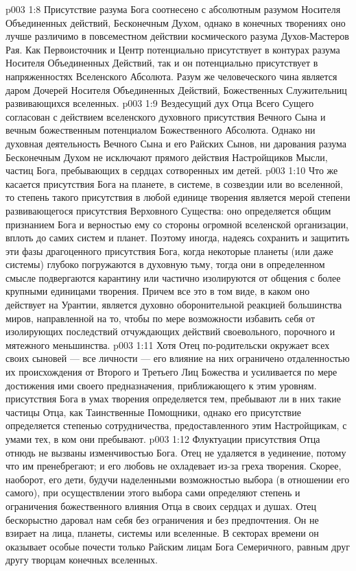 \vs p003 1:8 Присутствие разума Бога соотнесено с абсолютным разумом Носителя Объединенных действий, Бесконечным Духом, однако в конечных творениях оно лучше различимо в повсеместном действии космического разума Духов\hyp{}Мастеров Рая. Как Первоисточник и Центр потенциально присутствует в контурах разума Носителя Объединенных Действий, так и он потенциально присутствует в напряженностях Вселенского Абсолюта. Разум же человеческого чина является даром Дочерей Носителя Объединенных Действий, Божественных Служительниц развивающихся вселенных.
\vs p003 1:9 Вездесущий дух Отца Всего Сущего согласован с действием вселенского духовного присутствия Вечного Сына и вечным божественным потенциалом Божественного Абсолюта. Однако ни духовная деятельность Вечного Сына и его Райских Сынов, ни дарования разума Бесконечным Духом не исключают прямого действия Настройщиков Мысли, частиц Бога, пребывающих в сердцах сотворенных им детей.
\vs p003 1:10 Что же касается присутствия Бога на планете, в системе, в созвездии или во вселенной, то степень такого присутствия в любой единице творения является мерой степени развивающегося присутствия Верховного Существа: оно определяется общим признанием Бога и верностью ему со стороны огромной вселенской организации, вплоть до самих систем и планет. Поэтому иногда, надеясь сохранить и защитить эти фазы драгоценного присутствия Бога, когда некоторые планеты (или даже системы) глубоко погружаются в духовную тьму, тогда они в определенном смысле подвергаются карантину или частично изолируются от общения с более крупными единицами творения. Причем все это в том виде, в каком оно действует на Урантии, является духовно оборонительной реакцией большинства миров, направленной на то, чтобы по мере возможности избавить себя от изолирующих последствий отчуждающих действий своевольного, порочного и мятежного меньшинства.
\vs p003 1:11 \pc Хотя Отец по\hyp{}родительски окружает всех своих сыновей --- все личности --- его влияние на них ограничено отдаленностью их происхождения от Второго и Третьего Лиц Божества и усиливается по мере достижения ими своего предназначения, приближающего к этим уровням.  присутствия Бога в умах творения определяется тем, пребывают ли в них такие частицы Отца, как Таинственные Помощники, однако его  присутствие определяется степенью сотрудничества, предоставленного этим Настройщикам, с умами тех, в ком они пребывают.
\vs p003 1:12 Флуктуации присутствия Отца отнюдь не вызваны изменчивостью Бога. Отец не удаляется в уединение, потому что им пренебрегают; и его любовь не охладевает из\hyp{}за греха творения. Скорее, наоборот, его дети, будучи наделенными возможностью выбора (в отношении его самого), при осуществлении этого выбора сами определяют степень и ограничения божественного влияния Отца в своих сердцах и душах. Отец бескорыстно даровал нам себя без ограничения и без предпочтения. Он не взирает на лица, планеты, системы или вселенные. В секторах времени он оказывает особые почести только Райским лицам Бога Семеричного, равным друг другу творцам конечных вселенных.
